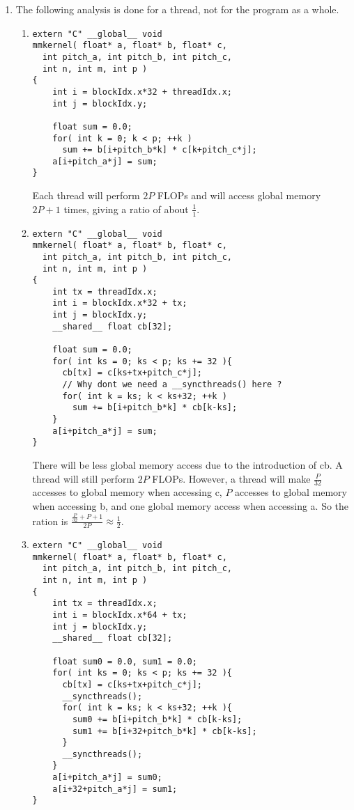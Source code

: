\documentclass[11pt]{article}
\begin{document}
\begin{enumerate}
\item The following analysis is done for a thread, not for the program as a whole.

\begin{enumerate}
\item
\begin{lstlisting}
extern "C" __global__ void
mmkernel( float* a, float* b, float* c,
  int pitch_a, int pitch_b, int pitch_c,
  int n, int m, int p )
{
    int i = blockIdx.x*32 + threadIdx.x;
    int j = blockIdx.y;

    float sum = 0.0;
    for( int k = 0; k < p; ++k ) 
      sum += b[i+pitch_b*k] * c[k+pitch_c*j];
    a[i+pitch_a*j] = sum; 
}
\end{lstlisting}

Each thread will perform $2P$ FLOPs and will access global memory $2P + 1$ times, giving a ratio of about $\frac11$.

\item
\begin{lstlisting}
extern "C" __global__ void
mmkernel( float* a, float* b, float* c,
  int pitch_a, int pitch_b, int pitch_c,
  int n, int m, int p )
{
    int tx = threadIdx.x;
    int i = blockIdx.x*32 + tx;
    int j = blockIdx.y;
    __shared__ float cb[32];

    float sum = 0.0;
    for( int ks = 0; ks < p; ks += 32 ){
      cb[tx] = c[ks+tx+pitch_c*j];
      // Why dont we need a __syncthreads() here ?
      for( int k = ks; k < ks+32; ++k )
        sum += b[i+pitch_b*k] * cb[k-ks];
    }
    a[i+pitch_a*j] = sum;
}
\end{lstlisting}	

There will be less global memory access due to the introduction of cb. A thread will still perform $2P$ FLOPs. However, a thread will make $\frac{P}{32}$ accesses to global memory when accessing c, $P$ accesses to global memory when accessing b, and one global memory access when accessing a. So the ration is $\frac{\frac{P}{32} + P + 1}{2P} \approx \frac12$.

\item
\begin{lstlisting}
extern "C" __global__ void
mmkernel( float* a, float* b, float* c,
  int pitch_a, int pitch_b, int pitch_c,
  int n, int m, int p )
{
    int tx = threadIdx.x;
    int i = blockIdx.x*64 + tx;
    int j = blockIdx.y;
    __shared__ float cb[32];

    float sum0 = 0.0, sum1 = 0.0;
    for( int ks = 0; ks < p; ks += 32 ){
      cb[tx] = c[ks+tx+pitch_c*j];
      __syncthreads();
      for( int k = ks; k < ks+32; ++k ){
        sum0 += b[i+pitch_b*k] * cb[k-ks];
        sum1 += b[i+32+pitch_b*k] * cb[k-ks];
      }
      __syncthreads();
    }
    a[i+pitch_a*j] = sum0;
    a[i+32+pitch_a*j] = sum1;
}
\end{lstlisting}


\end{enumerate}
\end{enumerate}
\end{document}
